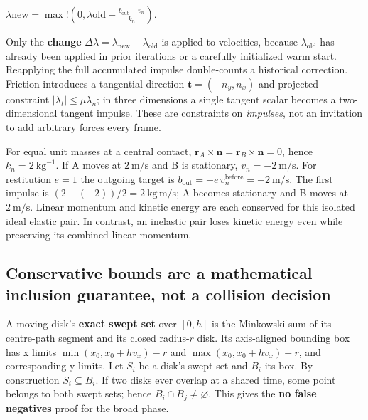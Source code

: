 \(\lambda{\mathrm{new}}=\max!\left(0,\lambda{\mathrm{old}} +\frac{b_{\mathrm{out}}-v_n}{k_n}\right).\)

Only the \textbf{change} \(\Delta\lambda=\lambda_{\mathrm{new}}-\lambda_{\mathrm{old}}\) is applied to velocities, because \(\lambda_{\mathrm{old}}\) has already been applied in prior iterations or a carefully initialized warm start. Reapplying the full accumulated impulse double-counts a historical correction. Friction introduces a tangential direction \(\mathbf t=(-n_y,n_x)\) and projected constraint \(|\lambda_t|\le\mu\lambda_n\); in three dimensions a single tangent scalar becomes a two-dimensional tangent impulse. These are constraints on \emph{impulses}, not an invitation to add arbitrary forces every frame.

For equal unit masses at a central contact, \(\mathbf r_A\times\mathbf n=\mathbf r_B\times\mathbf n=0\), hence \(k_n=2\ \mathrm{kg}^{-1}\). If A moves at \(2\ \mathrm{m/s}\) and B is stationary, \(v_n=-2\ \mathrm{m/s}\). For restitution \(e=1\) the outgoing target is \(b_{\mathrm{out}}=-e\,v_n^{\mathrm{before}}=+2\ \mathrm{m/s}\). The first impulse is \((2-(-2))/2=2\ \mathrm{kg\,m/s}\); A becomes stationary and B moves at \(2\ \mathrm{m/s}\). Linear momentum and kinetic energy are each conserved for this isolated ideal elastic pair. In contrast, an inelastic pair loses kinetic energy even while preserving its combined linear momentum.

\subsection{Conservative bounds are a mathematical inclusion guarantee, not a collision decision}\label{01-foundations-i-ch018-conservative-bounds-are-a-mathematical-inclusion-guarantee-not-a-collision-decision}

\hypertarget{01-foundations-i-ch018-conservative-bounds-are-a-mathematical-inclusion-guarantee-not-a-collision-decision}{}

A moving disk's \textbf{exact swept set} over \([0,h]\) is the Minkowski sum of its centre-path segment and its closed radius-\(r\) disk. Its axis-aligned bounding box has x limits \(\min(x_0,x_0+hv_x)-r\) and \(\max(x_0,x_0+hv_x)+r\), and corresponding y limits. Let \(S_i\) be a disk's swept set and \(B_i\) its box. By construction \(S_i\subseteq B_i\). If two disks ever overlap at a shared time, some point belongs to both swept sets; hence \(B_i\cap B_j\neq\varnothing\). This gives the \textbf{no false negatives} proof for the broad phase.

